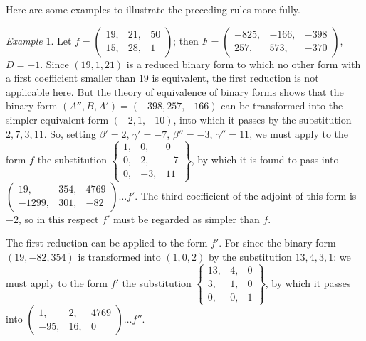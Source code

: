 Here are some examples to illustrate the preceding rules more fully.

\emph{Example} 1. Let \(f=\left(\begin{smallmatrix}19,&21,&50\\15,&28,&1\end{smallmatrix}\right)\); then \(F=\left(\begin{smallmatrix}-825,&-166,&-398\\257,&573,&-370\end{smallmatrix}\right)\), \(D=-1\). Since \((19,1,21)\) is a reduced binary form to which no other form with a first coefficient smaller than \(19\) is equivalent, the first reduction is not applicable here. But the theory of equivalence of binary forms shows that the binary form
\((A'',B,A')=(-398,257,-166)\) can be transformed into the simpler equivalent form \((-2,1,-10)\), into which it passes by the substitution \(2,7,3,11\). So, setting \(\beta'=2\), \(\gamma'=-7\), \(\beta''=-3\), \(\gamma''=11\), we must apply to the form \(f\) the substitution \(\left\{\begin{smallmatrix}1,&0,&0\\0,&2,&-7\\0,&-3,&11\end{smallmatrix}\right\}\), by which it is found to pass into \(\left(\begin{smallmatrix}19,&354,&4769\\-1299,&301,&-82\end{smallmatrix}\right)\ldots f'\). The third coefficient of the adjoint of this form is \(-2\), so in this respect \(f'\) must be regarded as simpler than \(f\).

The first reduction can be applied to the form \(f'\). For since the binary form \((19,-82,354)\) is transformed into \((1,0,2)\) by the substitution \(13,4,3,1\): we must apply to the form \(f'\) the substitution \(\left\{\begin{smallmatrix}13,&4,&0\\3,&1,&0\\0,&0,&1\end{smallmatrix}\right\}\), by which it passes into \(\left(\begin{smallmatrix}1,&2,&4769\\-95,&16,&0\end{smallmatrix}\right)\ldots f''\).

